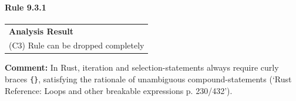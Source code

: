 \paragraph{Rule 9.3.1}
\begin{longtable}{p{13cm}}
\textbf{Analysis Result} \\
(C3) Rule can be dropped completely \\
\end{longtable}
\textbf{Comment:} In Rust, iteration and selection-statements always require curly braces \texttt{\{\}}, satisfying the rationale of unambiguous compound-statements (`Rust Reference: Loops and other breakable expressions p. 230/432'). \\
